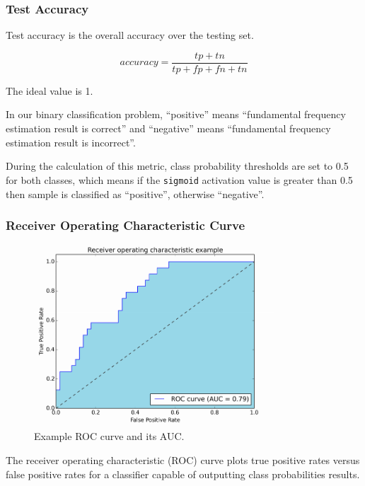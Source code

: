 \documentclass[11pt,a4paper,titlepage]{article}
\begin{document}
\subsubsection*{Test Accuracy}

Test accuracy is the overall accuracy over the testing set.

\begin{equation*}
  accuracy = \frac{tp+tn}{tp+fp+fn+tn}
\end{equation*}

The ideal value is 1.

In our binary classification problem, \enquote{positive} means \enquote{fundamental frequency estimation result is correct} and \enquote{negative} means \enquote{fundamental frequency estimation result is incorrect}.

During the calculation of this metric, class probability thresholds are set to 0.5 for both classes, which means if the \texttt{sigmoid} activation value is greater than 0.5 then sample is classified as \enquote{positive}, otherwise \enquote{negative}.

\subsubsection*{Receiver Operating Characteristic Curve}

\begin{figure}[htbp]
  \centering
  \includegraphics[width=0.8\textwidth]{roc-auc.png}
  \caption{Example ROC curve and its AUC.} \label{fig:roc}
\end{figure}

The receiver operating characteristic (ROC) curve plots true positive rates versus false positive rates for a classifier capable of outputting class probabilities results.
\end{document}
